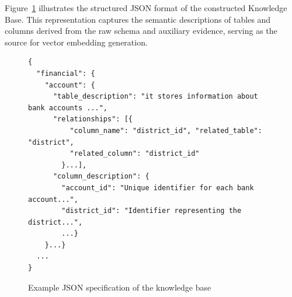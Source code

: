 \documentclass[runningheads]{llncs}
\begin{document}
Figure~\ref{fig:json-schema-example} illustrates the structured JSON format of the constructed Knowledge Base. This representation captures the semantic descriptions of tables and columns derived from the raw schema and auxiliary evidence, serving as the source for vector embedding generation.
\begin{figure}[ht]
\centering
\begin{minipage}{\linewidth}
\footnotesize
\begin{verbatim}
{
  "financial": {
    "account": {
      "table_description": "it stores information about bank accounts ...",
      "relationships": [{
          "column_name": "district_id", "related_table": "district", 
          "related_column": "district_id"
        }...],
      "column_description": {
        "account_id": "Unique identifier for each bank account...",
        "district_id": "Identifier representing the district...",
        ...}
    }...}
  ...
}
\end{verbatim}
\caption{Example JSON specification of the knowledge base}
\label{fig:json-schema-example}
\end{minipage}
\end{figure}
\end{document}
